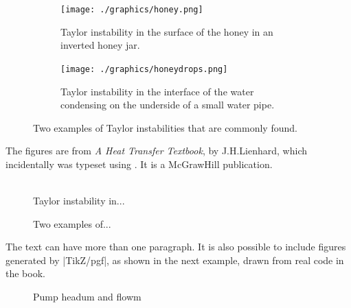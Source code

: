 \captionsetup[figure]{margin=10pt,font=small,labelfont=bf,format=hang}%

\begin{figure}[htbp]
\centering
  \begin{subfigure}[b]{0.5\textwidth}
  \texttt{[image: ./graphics/honey.png]}
  \caption{Taylor instability in the surface of the honey in an inverted honey jar.}\label{fig:honey}
    \hspace{1cm}
  \end{subfigure}

  \begin{subfigure}[b]{0.9\textwidth}
     \centering
     \texttt{[image: ./graphics/honeydrops.png]}
     \caption{Taylor instability in the interface of the water condensing on the underside of a small water pipe.}
  \end{subfigure}  
  \caption{Two examples of Taylor instabilities that are commonly found.}%
    \label{fig:Athird}%
\end{figure}

The figures are from \textit{A Heat Transfer Textbook}, by J.H.Lienhard, which incidentally was typeset using
\tex . It is a McGrawHill publication. 

\begin{teX}
\begin{figure}[htbp]
    \captionsetup[figure]{margin=10pt}%
    \hspace{1cm}
     \\[-10pt]
   \caption{Taylor instability in...}%
    \label{fig:Afirst}%
    \caption{Two examples of... }%
    \label{fig:honey}%
\end{figure}
\end{teX}


The text can have more than one paragraph. It is also possible to include figures
generated by |TikZ/pgf|, as shown in the next example, drawn from real code
in the book.


\begin{figure}
\pgfplotsset{width=5.0cm,compat=1.3}
\caption{Pump headum and flowm}
\end{figure}


